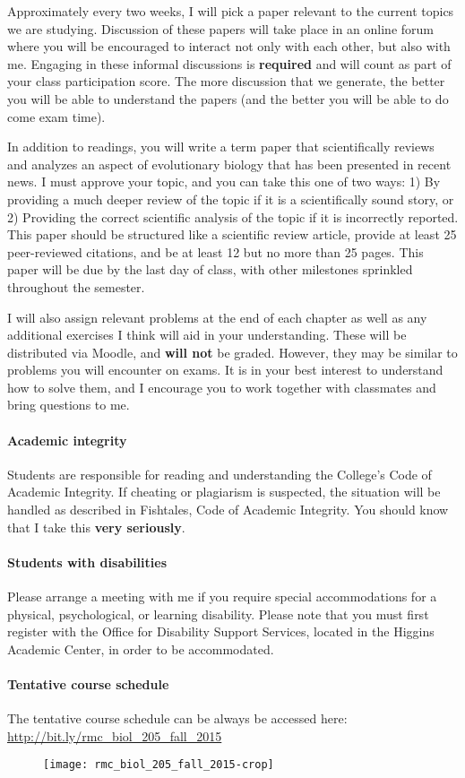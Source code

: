 \documentclass{article}
\begin{document}
Approximately every two weeks, I will pick a paper relevant to the current
topics we are
studying. Discussion of these papers will take place in an online forum where
you will be encouraged to interact not only with each other, but also with me.
Engaging in these informal discussions is \textbf{required} and will count as
part of your class participation score. The more discussion that we generate,
the better you will be able to understand the papers (and the better you will
be able to do come exam time).

In addition to readings, you will write a term paper that scientifically
reviews and analyzes an aspect of evolutionary biology that has been presented
in recent news. I must approve your topic, and you can take this one of two
ways: 1) By providing a much deeper review of the topic if it is a
scientifically sound story, or 2) Providing the correct scientific analysis of
the topic if it is incorrectly reported. This paper should be structured like
a scientific review article, provide at least 25 peer-reviewed citations, and
be at least 12 but no more than 25 pages.  This paper will be due by the last
day of class, with other milestones sprinkled throughout the semester.

I will also assign relevant problems at the end of each chapter as well as any
additional exercises I think will aid in your understanding. These will be
distributed via Moodle, and \textbf{will not} be graded.  However, they may be
similar to problems you will encounter on exams.  It is in your best interest
to understand how to solve them, and I encourage you to work together with
classmates and bring questions to me.


\paragraph{Academic integrity}
Students are responsible for reading and
understanding the College's Code of Academic Integrity.  If cheating or
plagiarism is suspected, the situation will be handled as described in
Fishtales, Code of Academic Integrity. You should know that I take this \textbf
{very seriously}.

\paragraph{Students with disabilities}
Please arrange a meeting with me if you
require special accommodations for a physical, psychological, or learning
disability.  Please note that you must first register with the Office for
Disability Support Services, located in the Higgins Academic Center, in order
to be accommodated.

\paragraph{Tentative course schedule}
The tentative course schedule can be always be accessed here: \\
\url{http://bit.ly/rmc_biol_205_fall_2015}

\begin{figure}[h]
\centering
\texttt{[image: rmc\_biol\_205\_fall\_2015-crop]}	
\end{figure}
\end{document}
